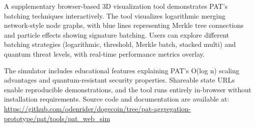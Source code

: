 \documentclass[iacr,final]{iacrtrans}
\begin{document}
A supplementary browser-based 3D visualization tool demonstrates PAT's batching techniques interactively. The tool visualizes logarithmic merging network-style node graphs, with blue lines representing Merkle tree connections and particle effects showing signature batching. Users can explore different batching strategies (logarithmic, threshold, Merkle batch, stacked multi) and quantum threat levels, with real-time performance metrics overlay.

The simulator includes educational features explaining PAT's O(log n) scaling advantages and quantum-resistant security properties. Shareable state URLs enable reproducible demonstrations, and the tool runs entirely in-browser without installation requirements. Source code and documentation are available at: \url{https://github.com/odenrider/dogecoin/tree/pat-aggregation-prototype/pat/tools/pat_web_sim}
\end{document}
